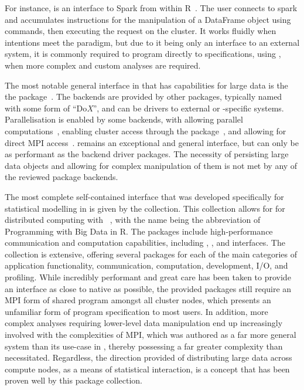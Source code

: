 \documentclass[letterpaper, inpress]{jds} %
\begin{document}
For instance,  is an interface to Spark from within R~\citep{luraschi20}.
The user connects to spark and accumulates instructions for the manipulation of a  DataFrame object using  commands, then executing the request on the  cluster.
It works fluidly when intentions meet the  paradigm, but due to it being only an interface to an external system, it is commonly required to program directly to  specifications, using , when more complex and custom analyses are required.

The most notable general interface in  that has capabilities for large data is the the  package~\citep{microsoft20}.
The backends are provided by other packages, typically named with some form of ``Do\emph{X}'', and can be drivers to external or -specific systems.
Parallelisation is enabled by some backends, with  allowing parallel computations~\citep{corporation19},  enabling cluster access through the  package~\citep{dosnow19}, and  allowing for direct MPI access~\citep{weston17}.
 remains an exceptional and general interface, but can only be as performant as the backend driver packages.
The necessity of persisting large data objects and allowing for complex manipulation of them is not met by any of the reviewed package backends.

The most complete self-contained interface that was developed specifically for statistical modelling in  is given by the  collection.
This collection allows for for distributed computing with ~\citep{pbdBASEpackage}, with the name being the abbreviation of Programming with Big Data in R.
The packages include high-performance communication and computation capabilities, including , , and  interfaces.
The collection is extensive, offering several packages for each of the main categories of application functionality, communication, computation, development, I/O, and profiling.
While incredibly performant and great care has been taken to provide an interface as close to native  as possible, the provided packages still require an MPI form of shared program amongst all cluster nodes, which presents an unfamiliar form of program specification to most  users.
In addition, more complex analyses requiring lower-level data manipulation end up increasingly involved with the complexities of MPI, which was authored as a far more general system than its use-case in , thereby possessing a far greater complexity than necessitated.
Regardless, the direction provided of distributing large data across compute nodes, as a means of statistical interaction, is a concept that has been proven well by this package collection.
\end{document}

